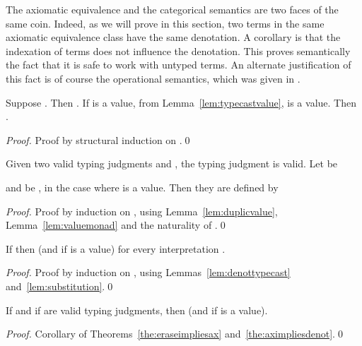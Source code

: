 \documentclass{llncs}
\begin{document}
The axiomatic equivalence and the categorical semantics are two faces
of the same coin.
Indeed, as we will prove in this section, two terms
in the same axiomatic equivalence class have the same
denotation. A corollary is that the indexation of terms does not
influence the denotation. This proves semantically the fact that it is
safe to work with untyped terms. An alternate justification of this
fact is of course the operational semantics, which was given in
{\cite{selinger05lambda}}.

\begin{lemma}\label{lem:denottypecast}
  Suppose .
  Then
  .
  If  is a value, from Lemma~\ref{lem:typecastvalue}, 
   is a value. Then
  .
\end{lemma}

\begin{proof}
  Proof by structural induction on .\qed
\end{proof}


\begin{lemma}[Substitution]\label{lem:substitution}
  Given two valid typing judgments  and , the typing judgment
   is valid. Let  be
  
  and  be ,
  in the case where  is a value. Then they are defined by\\
  \resizebox*{4.85in}{!}{
  }
\end{lemma}

\begin{proof}
  Proof by induction on , using Lemma~\ref{lem:duplicvalue},
  Lemma~\ref{lem:valuemonad} and the naturality of .\qed
\end{proof}



\begin{theorem}\label{the:aximpliesdenot}
  If  then
   (and  if  is a value) for every interpretation .
\end{theorem}

\begin{proof}
  Proof by induction on , using
  Lemmas~\ref{lem:denottypecast} and~\ref{lem:substitution}.\qed
\end{proof}


\begin{corollary}\label{cor:erasuredenot}
  If  and if  are valid
  typing judgments, then  (and
   if  is a value).
\end{corollary}

\begin{proof}
  Corollary of Theorems~\ref{the:eraseimpliesax}
  and~\ref{the:aximpliesdenot}.\qed
\end{proof}
\end{document}
